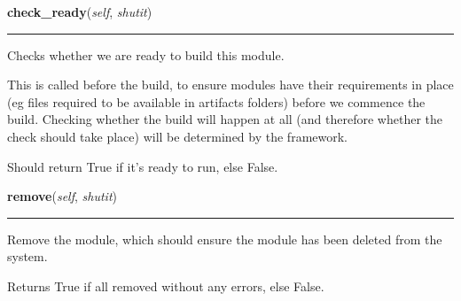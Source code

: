     \label{shutit_module:ShutItModule:check_ready}

    \vspace{0.5ex}

\hspace{.8\funcindent}\begin{boxedminipage}{\funcwidth}

    \raggedright \textbf{check\_ready}(\textit{self}, \textit{shutit})

    \vspace{-1.5ex}

    \rule{\textwidth}{0.5\fboxrule}
\setlength{\parskip}{2ex}
    Checks whether we are ready to build this module.

    This is called before the build, to ensure modules have their 
    requirements in place (eg files required to be available in artifacts 
    folders) before we commence the build. Checking whether the build will 
    happen at all (and therefore whether the check should take place) will 
    be determined by the framework.

    Should return True if it's ready to run, else False.

\setlength{\parskip}{1ex}
    \end{boxedminipage}

    \label{shutit_module:ShutItModule:remove}

    \vspace{0.5ex}

\hspace{.8\funcindent}\begin{boxedminipage}{\funcwidth}

    \raggedright \textbf{remove}(\textit{self}, \textit{shutit})

    \vspace{-1.5ex}

    \rule{\textwidth}{0.5\fboxrule}
\setlength{\parskip}{2ex}
    Remove the module, which should ensure the module has been deleted from
    the system.

    Returns True if all removed without any errors, else False.

\setlength{\parskip}{1ex}
    \end{boxedminipage}

